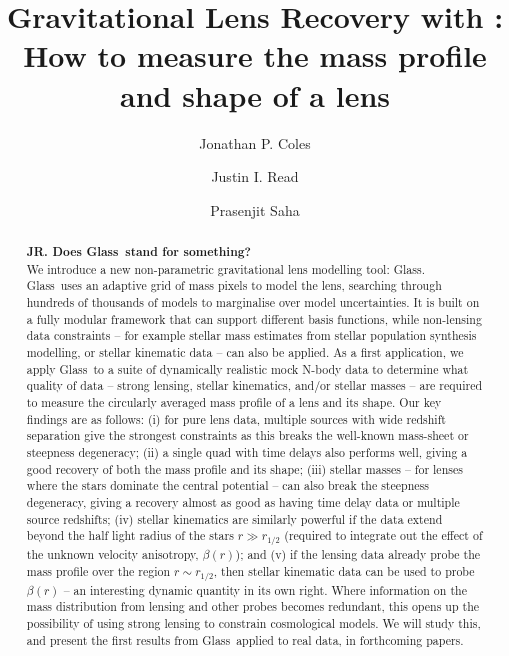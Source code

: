 \documentclass[galley,usenatbib]{mn2e}
\title[\Glass]{Gravitational Lens Recovery with \Glass: How to measure the mass profile and shape of a lens}
\author{%
Jonathan P. Coles 
\and 
Justin I. Read
\and 
Prasenjit Saha 
}
\newcommand{\Glass}{{\sc Glass}}
\begin{document}
\maketitle

\begin{abstract}
{\bf JR. Does \Glass\ stand for something?}\\
We introduce a new non-parametric gravitational lens modelling tool: \Glass. \Glass\ uses an adaptive grid of mass pixels to model the lens, searching through hundreds of thousands of models to marginalise over model uncertainties. It is built on a fully modular framework that can support different basis functions, while non-lensing data constraints -- for example stellar mass estimates from stellar population synthesis modelling, or stellar kinematic data -- can also be applied. As a first application, we apply \Glass\ to a suite of dynamically realistic mock N-body data to determine what quality of data -- strong lensing, stellar kinematics, and/or stellar masses -- are required to measure the circularly averaged mass profile of a lens and its shape. Our key findings are as follows: (i) for pure lens data, multiple sources with wide redshift separation give the strongest constraints as this breaks the well-known mass-sheet or steepness degeneracy; (ii) a single quad with time delays also performs well, giving a good recovery of both the mass profile and its shape; (iii) stellar masses -- for lenses where the stars dominate the central potential -- can also break the steepness degeneracy, giving a recovery almost as good as having time delay data or multiple source redshifts; (iv) stellar kinematics are similarly powerful if the data extend beyond the half light radius of the stars $r \gg r_{1/2}$ (required to integrate out the effect of the unknown velocity anisotropy, $\beta(r)$); and (v) if the lensing data already probe the mass profile over the region $r \sim r_{1/2}$, then stellar kinematic data can be used to probe $\beta(r)$ -- an interesting dynamic quantity in its own right. Where information on the mass distribution from lensing and other probes becomes redundant, this opens up the possibility of using strong lensing to constrain cosmological models. We will study this, and present the first results from \Glass\ applied to real data, in forthcoming papers.
\end{abstract}

\end{document}
